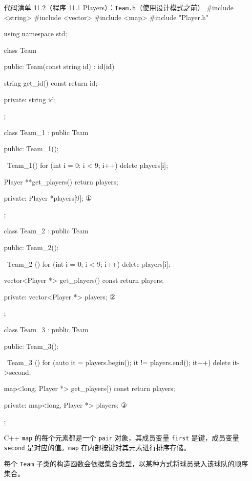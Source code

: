 \begin{codeboxt}{代码清单 11.2（程序 11.1 Players）：\texttt{Team.h}（使用设计模式之前）}
#include <string>
#include <vector>
#include <map>
#include "Player.h"

using namespace std;

class Team
{
public:
    Team(const string id) : id(id) {}

    string get_id() const { return id; }

private:
    string id;
};

class Team_1 : public Team
{
public:
    Team_1();

    ~Team_1() { for (int i = 0; i < 9; i++) delete players[i]; }

    Player **get_players() { return players; }

private:
    Player *players[9];           ①
};

class Team_2 : public Team
{
public:
    Team_2();

    ~Team_2 () { for (int i = 0; i < 9; i++) delete players[i]; }

    vector<Player *> get_players() const { return players; }

private:
    vector<Player *> players;     ②
};

class Team_3 : public Team
{
public:
    Team_3();

    ~Team_3 ()
    {
        for (auto it = players.begin(); it != players.end(); it++)
        {
            delete it->second;
        }
    }

    map<long, Player *> get_players() const { return players; }

private:
    map<long, Player *> players;  ③
};
\end{codeboxt}
\par
{}\par
{}\par

C++ \texttt{map} 的每个元素都是一个 \texttt{pair} 对象，其成员变量 \texttt{first} 是键，成员变量 \texttt{second} 是对应的值。\texttt{map} 在内部按键对其元素进行排序存储。


每个 \texttt{Team} 子类的构造函数会依据集合类型，以某种方式将球员录入该球队的顺序集合。

